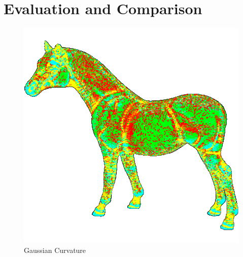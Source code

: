 \section{Evaluation and Comparison}
\begin{figure}[!htb]
    \includegraphics[width=\linewidth]{images/gaussian-horse.png}
    \caption{Gaussian Curvature}\label{fig:gaussian-horse}
  \endminipage
  \end{figure}